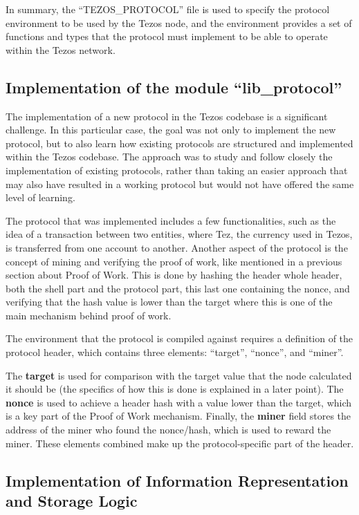 In summary, the ``TEZOS\_PROTOCOL'' file is used to specify the protocol environment to be used by the Tezos node, and the environment provides a set of functions and types that the protocol must implement to be able to operate within the Tezos network.

\subsection*{Implementation of the module ``lib\_protocol''}

The implementation of a new protocol in the Tezos codebase is a significant challenge.
In this particular case, the goal was not only to implement the new protocol, but to also learn how existing protocols are structured and implemented within the Tezos codebase. The approach was to study and follow closely the implementation of existing protocols, rather than taking an easier approach that may also have resulted in a working protocol but would not have offered the same level of learning.

The protocol that was implemented includes a few functionalities, such as the idea of a transaction between two entities, where Tez, the currency used in Tezos, is transferred from one account to another. 
Another aspect of the protocol is the concept of mining and verifying the proof of work, like mentioned in a previous section about Proof of Work.
This is done by hashing the header whole header, both the shell part and the protocol part, this last one containing the nonce, and verifying that the hash value is lower than the target where this is one of the main mechanism behind proof of work.

The environment that the protocol is compiled against requires a definition of the protocol header, which contains three elements: ``target'', ``nonce'', and ``miner''.

The \textbf{target} is used for comparison with the target value that the node calculated it should be (the specifics of how this is done is explained in a later point).
The \textbf{nonce} is used to achieve a header hash with a value lower than the target, which is a key part of the Proof of Work mechanism.
Finally, the \textbf{miner} field stores the address of the miner who found the nonce/hash, which is used to reward the miner. These elements combined make up the protocol-specific part of the header.


\subsection*{Implementation of Information Representation and Storage Logic}

